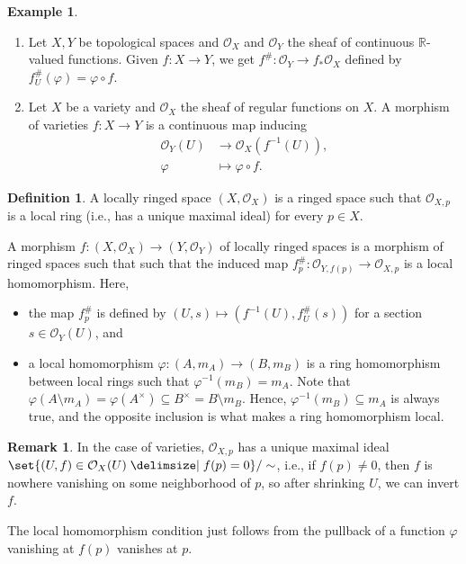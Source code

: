 \documentclass[a4paper]{amsbook}
\theoremstyle{definition}
\newtheorem*{definition*}{Definition}
\newtheorem*{remark*}{Remark}
\newtheorem*{example*}{Example}
\begin{document}
\begin{example*}
\label{RingedSpaceExamples}
\begin{enumerate}
	\item Let $X, Y$ be topological spaces and $\mathcal{O}_X$ and $\mathcal{O}_Y$
		the sheaf of continuous $\mathbb{R}$-valued functions. Given $f\colon X\to Y$,
		we get $f^\#\colon \mathcal{O}_Y\to f_*\mathcal{O}_X$ defined by
		$f_U^\#(\varphi) = \varphi \circ f$.
	\item Let $X$ be a variety and $\mathcal{O}_X$ the sheaf of regular functions
		on $X$. A morphism of varieties $f\colon X\to Y$ is a continuous map
		inducing
		\begin{align*}
			\mathcal{O}_Y(U) &\to \mathcal{O}_X(f^{-1}(U)),\\
			\varphi&\mapsto \varphi \circ f.
		\end{align*}
\end{enumerate}
\end{example*}

\begin{definition*}
\label{LocallyRingedSpace}
A locally ringed space $(X, \mathcal{O}_X)$ is a ringed space such that
$\mathcal{O}_{X, p}$ is a local ring (i.e., has a unique maximal
ideal) for every $p \in X$.

A morphism $f\colon (X, \mathcal{O}_X)\to (Y, \mathcal{O}_Y)$ of locally ringed spaces is a morphism of ringed spaces such that
such that the induced map $f_p^\#\colon \mathcal{O}_{Y, f(p)} \to \mathcal{O}_{X, p}$ is a local
homomorphism. Here,
\begin{itemize}
	\item the map $f_p^\#$ is defined by $(U, s)\mapsto (f^{-1}(U), f^\#_U(s))$ for
		a section $s \in \mathcal{O}_Y(U)$, and
	\item a local homomorphism $\varphi\colon (A, m_A)\to (B, m_B)$ is a ring homomorphism between local rings such that
		$\varphi^{-1}(m_B) = m_A$. Note that $\varphi(A\setminus m_A) = \varphi(A^\times) \subseteq B^\times = B\setminus m_B$.
		Hence, $\varphi^{-1}(m_B) \subseteq m_A$ is always true, and the opposite
		inclusion is what makes a ring homomorphism local.
\end{itemize}
\end{definition*}

\begin{remark*}
\label{LocallyRingedSpaceIntuition}
In the case of varieties, $\mathcal{O}_{X, p}$ has a unique maximal ideal
$\set{(U, f) \in \mathcal{O}_X(U)\given f(p) = 0}/\sim$, i.e., if $f(p)\neq 0$,
then $f$ is nowhere vanishing on some neighborhood of $p$, so after shrinking
$U$, we can invert $f$.

The local homomorphism condition just follows from the pullback of a function
$\varphi$ vanishing at $f(p)$ vanishes at $p$.
\end{remark*}
\end{document}
